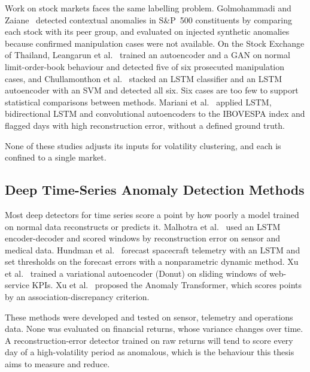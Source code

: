 Work on stock markets faces the same labelling problem. Golmohammadi and
Zaiane~\cite{golmohammadi2015time} detected contextual anomalies in S\&P~500 constituents
by comparing each stock with its peer group, and evaluated on injected synthetic anomalies
because confirmed manipulation cases were not available. On the Stock Exchange of Thailand,
Leangarun et al.~\cite{leangarun2021stock} trained an autoencoder and a GAN on normal
limit-order-book behaviour and detected five of six prosecuted manipulation cases, and
Chullamonthon et al.~\cite{chullamonthon2023ensemble} stacked an LSTM classifier and an
LSTM autoencoder with an SVM and detected all six. Six cases are too few to support
statistical comparisons between methods. Mariani et al.~\cite{mariani2021autoencoder}
applied LSTM, bidirectional LSTM and convolutional autoencoders to the IBOVESPA index and
flagged days with high reconstruction error, without a defined ground truth.

None of these studies adjusts its inputs for volatility clustering, and each is confined to
a single market.

\subsection{Deep Time-Series Anomaly Detection Methods}
Most deep detectors for time series score a point by how poorly a model trained on normal
data reconstructs or predicts it. Malhotra et al.~\cite{malhotra2016lstm} used an LSTM
encoder-decoder and scored windows by reconstruction error on sensor and medical data.
Hundman et al.~\cite{hundman2018detecting} forecast spacecraft telemetry with an LSTM and set
thresholds on the forecast errors with a nonparametric dynamic method. Xu et
al.~\cite{xu2018unsupervised} trained a variational autoencoder (Donut) on sliding windows
of web-service KPIs. Xu et al.~\cite{xu2022anomaly} proposed the Anomaly Transformer, which
scores points by an association-discrepancy criterion.

These methods were developed and tested on sensor, telemetry and operations data. None was
evaluated on financial returns, whose variance changes over time. A reconstruction-error
detector trained on raw returns will tend to score every day of a high-volatility period as
anomalous, which is the behaviour this thesis aims to measure and reduce.

